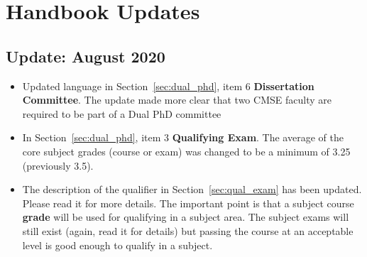 \section* {Handbook Updates}
\label{sec:updates}

\subsection*{Update: August 2020}

\begin{itemize}

  \item Updated language in Section~\ref{sec:dual_phd}, item 6 \textbf{Dissertation
    Committee}. The update made more clear that two CMSE faculty are
    required to be part of a Dual PhD committee

  \item In Section~\ref{sec:dual_phd}, item 3 \textbf{Qualifying
    Exam}. The average of the core subject grades (course or exam) was
    changed to be a minimum of 3.25 (previously 3.5).

  \item The description of the qualifier in
    Section~\ref{sec:qual_exam} has been updated. Please read it for
    more details. The important point is that a subject course
    \textbf{grade} will be used for qualifying in a subject area. The
    subject exams will still exist (again, read it for details) but
    passing the course at an acceptable level is good enough to
    qualify in a subject.

\end{itemize}
